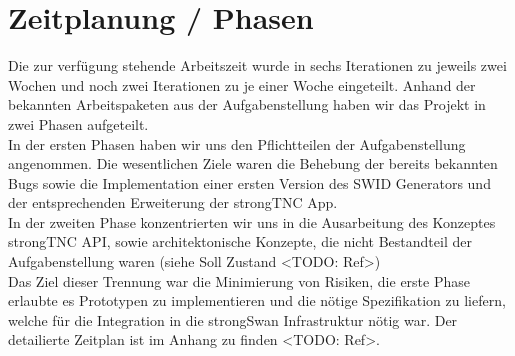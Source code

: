 \section{Zeitplanung / Phasen}
Die zur verfügung stehende Arbeitszeit wurde in sechs Iterationen zu jeweils
zwei Wochen und noch zwei Iterationen zu je einer Woche eingeteilt. Anhand der
bekannten Arbeitspaketen aus der Aufgabenstellung haben wir das Projekt in zwei
Phasen aufgeteilt.\\
In der ersten Phasen haben wir uns den Pflichtteilen der Aufgabenstellung
angenommen. Die wesentlichen Ziele waren die Behebung der bereits bekannten Bugs
sowie die Implementation einer ersten Version des SWID Generators und der
entsprechenden Erweiterung der strongTNC App. \\
In der zweiten Phase konzentrierten wir uns in die Ausarbeitung des Konzeptes
strongTNC API, sowie architektonische Konzepte, die nicht Bestandteil der
Aufgabenstellung waren (siehe Soll Zustand <TODO: Ref>)\\
Das Ziel dieser Trennung war die Minimierung von Risiken, die erste Phase
erlaubte es Prototypen zu implementieren und die nötige Spezifikation zu
liefern, welche für die Integration in die strongSwan Infrastruktur nötig war.
Der detailierte Zeitplan ist im Anhang zu finden <TODO: Ref>.
